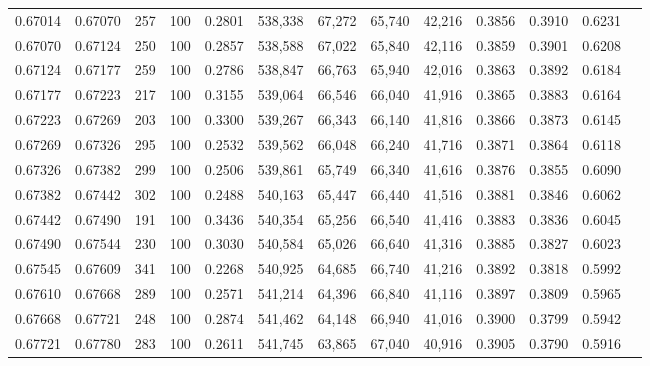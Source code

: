 \begin{tabular}{rrrrrrrrrrrrr}
0.67014 & 0.67070 &   257 & 100 &                                     0.2801 & 538,338 &  67,272 &  65,740 &  42,216 & 0.3856 & 0.3910 & 0.6231 \\
0.67070 & 0.67124 &   250 & 100 &                                     0.2857 & 538,588 &  67,022 &  65,840 &  42,116 & 0.3859 & 0.3901 & 0.6208 \\
0.67124 & 0.67177 &   259 & 100 &                                     0.2786 & 538,847 &  66,763 &  65,940 &  42,016 & 0.3863 & 0.3892 & 0.6184 \\
0.67177 & 0.67223 &   217 & 100 &                                     0.3155 & 539,064 &  66,546 &  66,040 &  41,916 & 0.3865 & 0.3883 & 0.6164 \\
0.67223 & 0.67269 &   203 & 100 &                                     0.3300 & 539,267 &  66,343 &  66,140 &  41,816 & 0.3866 & 0.3873 & 0.6145 \\
0.67269 & 0.67326 &   295 & 100 &                                     0.2532 & 539,562 &  66,048 &  66,240 &  41,716 & 0.3871 & 0.3864 & 0.6118 \\
0.67326 & 0.67382 &   299 & 100 &                                     0.2506 & 539,861 &  65,749 &  66,340 &  41,616 & 0.3876 & 0.3855 & 0.6090 \\
0.67382 & 0.67442 &   302 & 100 &                                     0.2488 & 540,163 &  65,447 &  66,440 &  41,516 & 0.3881 & 0.3846 & 0.6062 \\
0.67442 & 0.67490 &   191 & 100 &                                     0.3436 & 540,354 &  65,256 &  66,540 &  41,416 & 0.3883 & 0.3836 & 0.6045 \\
0.67490 & 0.67544 &   230 & 100 &                                     0.3030 & 540,584 &  65,026 &  66,640 &  41,316 & 0.3885 & 0.3827 & 0.6023 \\
0.67545 & 0.67609 &   341 & 100 &                                     0.2268 & 540,925 &  64,685 &  66,740 &  41,216 & 0.3892 & 0.3818 & 0.5992 \\
0.67610 & 0.67668 &   289 & 100 &                                     0.2571 & 541,214 &  64,396 &  66,840 &  41,116 & 0.3897 & 0.3809 & 0.5965 \\
0.67668 & 0.67721 &   248 & 100 &                                     0.2874 & 541,462 &  64,148 &  66,940 &  41,016 & 0.3900 & 0.3799 & 0.5942 \\
0.67721 & 0.67780 &   283 & 100 &                                     0.2611 & 541,745 &  63,865 &  67,040 &  40,916 & 0.3905 & 0.3790 & 0.5916 \\

\end{tabular}
